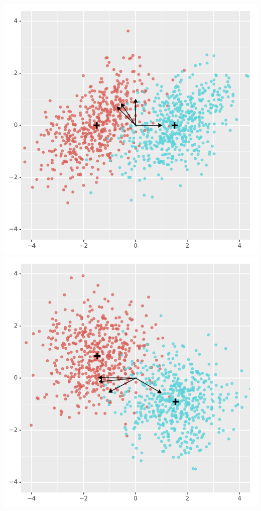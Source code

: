 \documentclass[landscape,footrule]{foils}
\begin{document}
\centerline{
\includegraphics[scale=0.70]{general_lda_setup_ii}\hspace*{1cm}
\includegraphics[scale=0.70]{general_lda_setup_iv}}\vspace*{-1ex}
\end{document}
